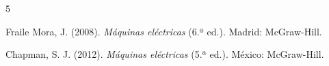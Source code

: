 \documentclass[../main]{subfiles}
\begin{document}
\begin{thebibliography}{5}

  Fraile Mora, J. (2008).
  \textit{Máquinas eléctricas} (6.ª ed.). Madrid: McGraw-Hill.

  Chapman, S. J. (2012).
  \textit{Máquinas eléctricas} (5.ª ed.). México: McGraw-Hill.

\end{thebibliography}
\end{document}
